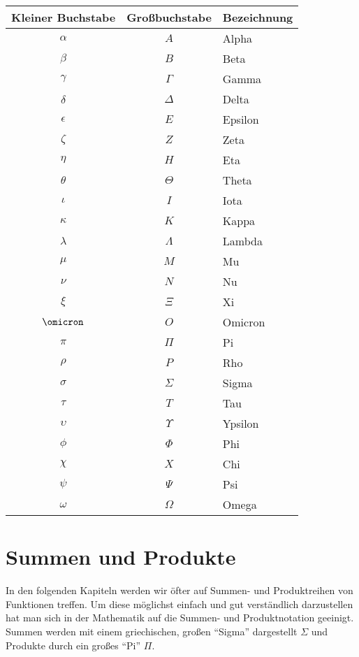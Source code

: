 \begin{center}
\begin{tabular}{c|c|l}
\hline
\textbf{Kleiner Buchstabe} & \textbf{Großbuchstabe} & \textbf{Bezeichnung} \\
\hline
$\alpha $ & $A $ & Alpha \\
$\beta $ & $B $ & Beta \\
$\gamma $ & $\Gamma $ & Gamma \\
$\delta $ & $\Delta $ & Delta \\
$\epsilon $ & $E $ & Epsilon \\
$\zeta $ & $Z $ & Zeta \\
$\eta $ & $H $ &  Eta\\
$\theta $ & $\Theta $ & Theta \\
$\iota $ & $I $ & Iota \\
$\kappa $ & $K $ & Kappa \\
$\lambda $ & $\Lambda $ & Lambda \\
$\mu $ & $M $ & Mu \\
$\nu $ & $N $ & Nu \\
$\xi $ & $\Xi $ &  Xi \\
$\omicron $ & $O $ & Omicron \\
$\pi $ & $\Pi $ & Pi \\
$\rho $ & $P $ & Rho \\
$\sigma $ & $\Sigma $ & Sigma  \\
$\tau $ & $T $ & Tau \\
$\upsilon $ & $\Upsilon $ & Ypsilon \\
$\phi $ & $\Phi $ & Phi \\
$\chi $ & $X $ & Chi \\
$\psi $ & $\Psi $ & Psi \\
$\omega $ & $\Omega $ & Omega \\
\hline
\end{tabular}
\end{center}


\section{Summen und Produkte}

In den folgenden Kapiteln werden wir öfter auf Summen- und Produktreihen von Funktionen treffen. Um diese möglichst einfach und gut verständlich darzustellen hat man sich in der Mathematik auf die Summen- und Produktnotation geeinigt. Summen werden mit einem griechischen, großen "`Sigma"' dargestellt $\Sigma$ und Produkte durch ein großes "`Pi"' $\Pi$.

